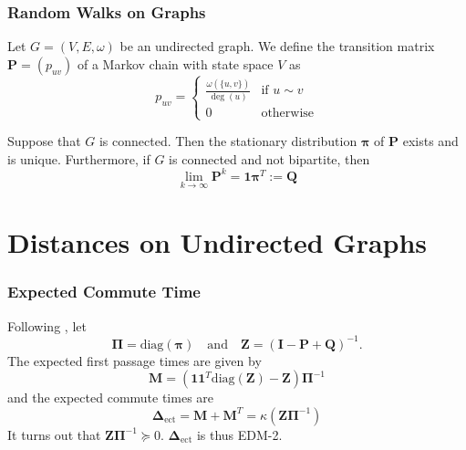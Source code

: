 \documentclass[professionalfonts, hyperref={pdfpagelabels=false,
  colorlinks=true, linkcolor=purple}]{beamer}
\begin{document}
\begin{frame}
  \frametitle{Random Walks on Graphs}
  Let $G = (V,E,\omega)$ be an undirected graph. We define the transition matrix
  $\bm{P} = (p_{uv})$ of a Markov chain with state space $V$ as
  \begin{equation}
    \label{eq:1}
    p_{uv} = \begin{cases}
      \tfrac{\omega(\{u,v\})}{\deg(u)} & \text{if $u \sim v$} \\
      0 & \text{otherwise}
    \end{cases}
  \end{equation}
  
  \vskip10pt Suppose that $G$ is connected. Then the stationary
  distribution $\bm{\pi}$ of $\mathbf{P}$ exists and is
  unique. Furthermore, if $G$ is connected and not bipartite, then 
  \begin{equation}
    \label{eq:2}
 \lim_{k \rightarrow \infty} \mathbf{P}^{k} = \bm{1}\bm{\pi}^{T} :=
  \mathbf{Q}
  \end{equation}
\end{frame}

\section{Distances on Undirected Graphs}
\begin{frame}
  \frametitle{Expected Commute Time}
  Following \cite{kemeny83:_finit_markov_chain}, let
  \begin{equation*}
    \bm{\Pi} = \mathrm{diag}(\bm{\pi}) \quad \text{and} \quad
    \mathbf{Z} = (\mathbf{I} - \mathbf{P} + \mathbf{Q})^{-1}.
  \end{equation*}
  The expected first passage times are given by
  \begin{equation*}
    \mathbf{M} = (\mathbf{1}\mathbf{1}^{T}\mathrm{diag}(\mathbf{Z}) -
    \mathbf{Z})\bm{\Pi}^{-1} 
  \end{equation*}
  and the expected commute times are
  \begin{equation*}
    \bm{\Delta}_{\mathrm{ect}} = \mathbf{M} + \mathbf{M}^{T} =
    \kappa(\mathbf{Z}\bm{\Pi}^{-1})
  \end{equation*}
  It turns out that $\mathbf{Z}\bm{\Pi}^{-1} \succeq
  0$. $\bm{\Delta}_{\mathrm{ect}}$ is thus \alert{EDM-2}.
\end{frame}
\end{document}
